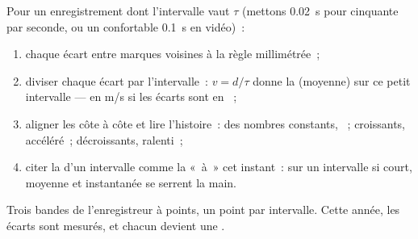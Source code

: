 \begin{method}\label{met:g9:uniform-varied-motion:read}
Pour un enregistrement dont l'intervalle vaut $\tau$ (mettons
\qty{0.02}{s} pour cinquante par seconde, ou un confortable
\qty{0.1}{s} en vidéo)~:
\begin{enumerate}
  \item {} chaque écart entre marques voisines à la règle
        millimétrée~;
  \item diviser chaque écart par l'intervalle~: $v = d/\tau$ donne
        la  (moyenne) sur ce petit intervalle --- en
        \unit{m/s} si les écarts sont en ~;
  \item aligner les  côte à côte et lire l'histoire~: des
        nombres constants, ~; croissants,
        accéléré~; décroissants, ralenti~;
  \item citer la  d'un intervalle comme la  «~à~» cet
        instant~: sur un intervalle si court, moyenne et
        instantanée se serrent la main.
\end{enumerate}
\end{method}

\begin{omfigure}

{\small Trois bandes de l'enregistreur à points, un point par
intervalle. Cette année, les écarts sont mesurés, et chacun devient
une .}
\end{omfigure}

